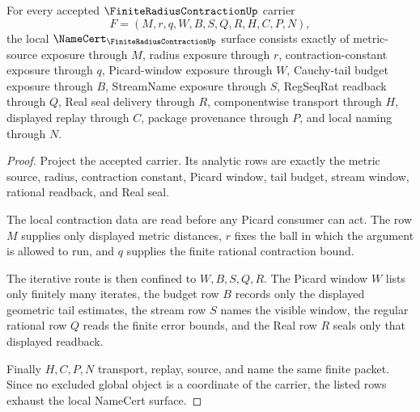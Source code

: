\begin{theorem}
\label{thm:finite-radius-contraction-namecert-obligations}
For every accepted $\FiniteRadiusContractionUp$ carrier
$$
F=(M,r,q,W,B,S,Q,R,H,C,P,N),
$$
the local $\NameCert_{\FiniteRadiusContractionUp}$ surface consists exactly of metric-source exposure through $M$, radius exposure through $r$, contraction-constant exposure through $q$, Picard-window exposure through $W$, Cauchy-tail budget exposure through $B$, StreamName exposure through $S$, RegSeqRat readback through $Q$, Real seal delivery through $R$, componentwise transport through $H$, displayed replay through $C$, package provenance through $P$, and local naming through $N$.
\end{theorem}
\begin{proof}
Project the accepted carrier. Its analytic rows are exactly the metric source, radius, contraction constant, Picard window, tail budget, stream window, rational readback, and Real seal.

The local contraction data are read before any Picard consumer can act. The row $M$ supplies only displayed metric distances, $r$ fixes the ball in which the argument is allowed to run, and $q$ supplies the finite rational contraction bound.

The iterative route is then confined to $W,B,S,Q,R$. The Picard window $W$ lists only finitely many iterates, the budget row $B$ records only the displayed geometric tail estimates, the stream row $S$ names the visible window, the regular rational row $Q$ reads the finite error bounds, and the Real row $R$ seals only that displayed readback.

Finally $H,C,P,N$ transport, replay, source, and name the same finite packet. Since no excluded global object is a coordinate of the carrier, the listed rows exhaust the local NameCert surface.
\end{proof}

